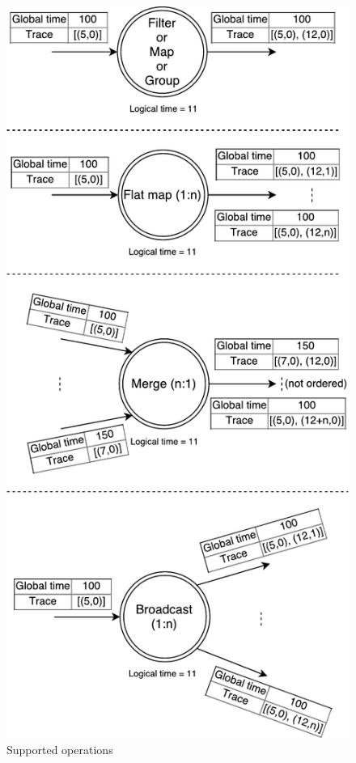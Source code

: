 \begin{figure}[htbp]
  \centering
  \includegraphics[scale=0.5]{pics/operations}
  \caption{Supported operations}
  \label {logical-graph-ops-figure}
\end{figure}

